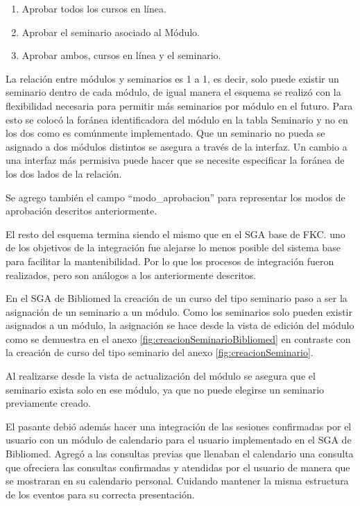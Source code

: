 	\begin{enumerate}
		\item Aprobar todos los cursos en línea.
		\item Aprobar el seminario asociado al Módulo.
		\item Aprobar ambos, cursos en línea y el seminario.
	\end{enumerate}

	La relación entre módulos y seminarios es 1 a 1, es decir, solo puede existir un seminario dentro de cada módulo, de igual manera el esquema se realizó con la flexibilidad necesaria para permitir más seminarios por módulo en el futuro. Para esto se colocó la foránea identificadora del módulo en la tabla Seminario y no en los dos como es comúnmente implementado. Que un seminario no pueda se asignado a dos módulos distintos se asegura a través de la interfaz. Un cambio a una interfaz más permisiva puede hacer que se necesite especificar la foránea de los dos lados de la relación. 

	Se agrego también el campo ``modo\_aprobacion'' para representar los modos de aprobación descritos anteriormente.

	El resto del esquema termina siendo el mismo que en el SGA base de FKC. uno de los objetivos de la integración fue alejarse lo menos posible del sistema base para facilitar la mantenibilidad. Por lo que los procesos de integración fueron realizados, pero son análogos a los anteriormente descritos.

	En el SGA de Bibliomed la creación de un curso del tipo seminario paso a ser la asignación de un seminario a un módulo. Como los seminarios solo pueden existir asignados a un módulo, la asignación se hace desde la vista de edición del módulo como se demuestra en el anexo \ref{fig:creacionSeminarioBibliomed} en contraste con la creación de curso del tipo seminario del anexo \ref{fig:creacionSeminario}.

	Al realizarse desde la vista de actualización del módulo se asegura que el seminario exista solo en ese módulo, ya que no puede elegirse un seminario previamente creado.

	El pasante debió además hacer una integración de las sesiones confirmadas por el usuario con un módulo de calendario para el usuario implementado en el SGA de Bibliomed. Agregó a las consultas previas que llenaban el calendario una consulta que ofreciera las consultas confirmadas y atendidas por el usuario de manera que se mostraran en su calendario personal. Cuidando mantener la misma estructura de los eventos para su correcta presentación.



